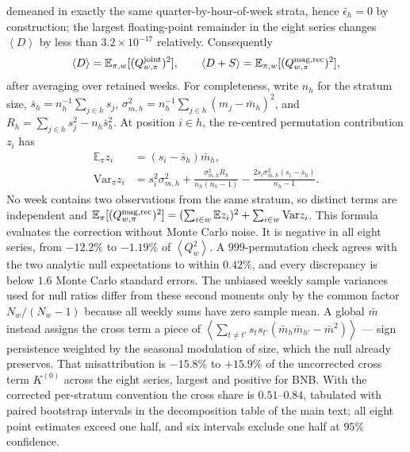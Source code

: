 \documentclass[aps,pre,onecolumn,superscriptaddress,floatfix,nofootinbib]{revtex4-2}
\newcommand{\avg}[1]{\left\langle #1 \right\rangle}
\newcommand{\Var}{\mathrm{Var}}
\begin{document}
demeaned in exactly the same quarter-by-hour-of-week strata, hence
$\bar\epsilon_h=0$ by construction; the largest floating-point remainder in
the eight series changes $\avg D$ by less than $3.2\times10^{-17}$
relatively. Consequently
\begin{equation}
  \avg{D}=\mathbb E_{\pi,w}[(Q_{w,\pi}^{\rm joint})^2],\qquad
  \avg{D+S}=\mathbb E_{\pi,w}[(Q_{w,\pi}^{\rm mag,rec})^2] ,
  \label{eq:supp-nullequal}
\end{equation}
after averaging over retained weeks. For completeness, write $n_h$ for
the stratum size, $\bar s_h=n_h^{-1}\sum_{j\in h}s_j$,
$\sigma_{m,h}^2=n_h^{-1}\sum_{j\in h}(m_j-\bar m_h)^2$, and
$R_h=\sum_{j\in h}s_j^2-n_h\bar s_h^2$. At position $i\in h$, the re-centred
permutation contribution $z_i$ has
\begin{align}
 \mathbb E_\pi z_i&=(s_i-\bar s_h)\bar m_h,\\
 \Var_\pi z_i&=s_i^2\sigma_{m,h}^2
 +\frac{\sigma_{m,h}^2R_h}{n_h(n_h-1)}
 -\frac{2s_i\sigma_{m,h}^2(s_i-\bar s_h)}{n_h-1}.
 \label{eq:supp-recmoments}
\end{align}
No week contains two observations from the same stratum, so distinct terms are
independent and
$\mathbb E_\pi[(Q_{w,\pi}^{\rm mag,rec})^2]
=(\sum_{i\in w}\mathbb E z_i)^2+\sum_{i\in w}\Var z_i$.
This formula evaluates the correction without Monte Carlo noise. It is
negative in all eight series, from $-12.2\%$ to $-1.19\%$ of
$\avg{Q_w^2}$. A $999$-permutation check agrees with the two analytic null
expectations to within $0.42\%$, and every discrepancy is below $1.6$ Monte
Carlo standard errors. The unbiased weekly sample variances used for null
ratios differ from these second moments only by the common factor
$N_w/(N_w-1)$ because all weekly sums have zero sample mean. A global $\bar m$
instead assigns the cross term a piece of
$\avg{\sum_{t\neq t'}s_ts_{t'}(\bar m_h\bar m_{h'}-\bar m^2)}$ --- sign
persistence weighted by the seasonal modulation of size, which the null
already preserves. That misattribution is $-15.8\%$ to $+15.9\%$ of the
uncorrected cross term $K^{(0)}$ across the eight series, largest and positive
for BNB. With the corrected per-stratum convention the cross share is
$0.51$--$0.84$, tabulated with paired bootstrap intervals in the decomposition
table of the main text; all eight point estimates exceed one half, and six
intervals exclude one half at $95\%$ confidence.
\end{document}
